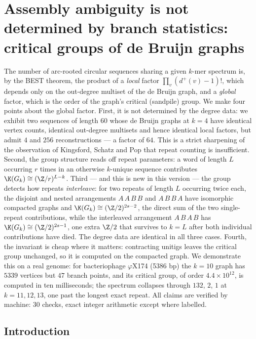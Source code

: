 \chapter{Assembly ambiguity is not determined by branch statistics: critical groups of de Bruijn graphs}\label{chap:Bio1}
\begin{chapterabstract}
\noindent
The number of arc-rooted circular sequences sharing a given $k$-mer spectrum is, by the
BEST theorem, the product of a \emph{local} factor $\prod_v(d^+(v)-1)!$, which depends only
on the out-degree multiset of the de Bruijn graph, and a \emph{global} factor, which is the
order of the graph's critical (sandpile) group. We make four points about the global factor.
First, it is not determined by the degree data: we exhibit two sequences of length $60$
whose de Bruijn graphs at $k=4$ have identical vertex counts, identical out-degree
multisets and hence identical local factors, but admit $4$ and $256$ reconstructions --- a
factor of $64$. This is a strict sharpening of the observation of Kingsford, Schatz and Pop
that repeat counting is insufficient. Second, the group structure reads off repeat
parameters: a word of length $L$ occurring $r$ times in an otherwise $k$-unique sequence
contributes $\K(G_k)\cong(\Z/r)^{L-k}$. Third --- and this is new in this version --- the
group detects how repeats \emph{interleave}: for two repeats of length $L$ occurring twice
each, the disjoint and nested arrangements $A\,A\,B\,B$ and $A\,B\,B\,A$ have isomorphic
compacted graphs and $\K(G_k)\cong(\Z/2)^{2s-2}$, the direct sum of the two single-repeat
contributions, while the interleaved arrangement $A\,B\,A\,B$ has $\K(G_k)\cong(\Z/2)^{2s-1}$,
one extra $\Z/2$ that survives to $k=L$ after both individual contributions have died. The
degree data are identical in all three cases. Fourth, the invariant is cheap where it
matters: contracting unitigs leaves the critical group unchanged, so it is computed on the
compacted graph. We demonstrate this on a real genome: for bacteriophage $\varphi$X174
(5386 bp) the $k=10$ graph has $5339$ vertices but $47$ branch points, and its critical
group, of order $4.4\times10^{12}$, is computed in ten milliseconds; the spectrum collapses
through $132$, $2$, $1$ at $k=11,12,13$, one past the longest exact repeat. All claims are
verified by machine: $30$ checks, exact integer arithmetic except where labelled.
\end{chapterabstract}

\section{Introduction}\label{Bio1:sec:intro}

